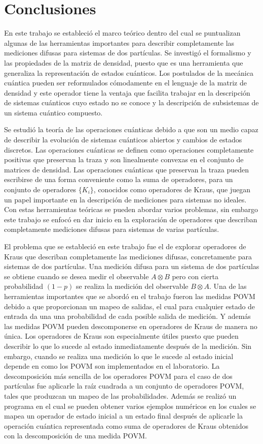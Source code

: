 \chapter{Conclusiones }

En este trabajo se estableció el marco teórico dentro del cual se puntualizan algunas de las herramientas importantes para describir completamente las mediciones difusas para sistemas de dos partículas. Se investigó el formalismo y las propiedades de la matriz de densidad, puesto que es una herramienta que generaliza la representación de estados cuánticos. Los postulados de la mecánica cuántica pueden ser reformulados cómodamente en el lenguaje de la matriz de densidad y este operador tiene la ventaja que facilita trabajar en la descripción de sistemas cuánticos cuyo estado no se conoce  y la descripción de subsistemas de un sistema cuántico compuesto. 

Se estudió la teoría de las operaciones cuánticas debido a que son un medio capaz de describir la evolución de sistemas cuánticos abiertos y cambios de estados discretos. Las operaciones cuánticas se definen como operaciones completamente positivas que preservan la traza y son linealmente convexas en el conjunto de matrices de densidad. Las operaciones cuánticas que preservan la traza pueden escribirse de una forma conveniente como la suma de operadores, para un conjunto de operadores $\{K_i\}$, conocidos como operadores de Kraus, que juegan un papel importante en la descripción de mediciones para sistemas no ideales. Con estas herramientas teóricas se pueden abordar varios problemas, sin embargo este trabajo se enfocó en dar inicio en la exploración de operadores que describan completamente mediciones difusas para sistemas de varias partículas. 


El problema que se estableció en este trabajo fue el de explorar operadores de Kraus que describan completamente las mediciones difusas, concretamente para sistemas de dos partículas. Una medición difusa para un sistema de dos partículas se obtiene cuando se desea medir el observable $A\otimes B$ pero con cierta probabilidad $(1-p)$ se realiza la medición del observable $B\otimes A $. Una de las herramientas importantes que se abordó en el trabajo fueron las medidas POVM debido a que proporcionan un mapeo de salidas, el cual para cualquier estado de entrada da una una probabilidad de cada posible salida de medición. Y además las medidas POVM pueden descomponerse en operadores de Kraus de manera no única. Los operadores de Kraus son especialmente útiles puesto que pueden describir lo que lo sucede al estado inmediatamente después de la medición. Sin embargo, cuando se realiza una medición lo que le sucede al estado inicial depende en como los POVM son implementados en el laboratorio. La descomposición más sencilla de los operadores POVM para el caso de dos partículas fue aplicarle la raíz cuadrada a un conjunto de operadores POVM, tales que produzcan un mapeo de las probabilidades. Además se realizó un programa en el cual se pueden obtener varios ejemplos numéricos en los cuales se mapea un operador de estado inicial a un estado final después de aplicarle la operación cuántica representada como suma de operadores de Kraus obtenidos con la descomposición de una medida POVM\@.


